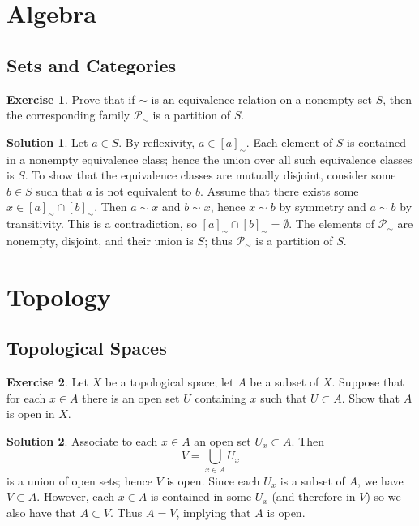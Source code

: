\documentclass{article}
\theoremstyle{definition}
\newtheorem{exercise}{Exercise}
\newtheorem*{solution}{Solution}
\begin{document}
\section*{Algebra}
\subsection*{Sets and Categories}

\begin{exercise}
    Prove that if \(\sim\) is an equivalence relation on a nonempty set \(S\), then the corresponding family \(\mathscr{P}_\sim\) is a partition of \(S\).
\end{exercise}
\begin{solution}
    Let \(a\in S\). By reflexivity, \(a\in[a]_\sim\). Each element of \(S\) is contained in a nonempty equivalence class; hence the union over all such equivalence classes is \(S\). To show that the equivalence classes are mutually disjoint, consider some \(b\in S\) such that \(a\) is not equivalent to \(b\). Assume that there exists some \(x\in [a]_\sim\cap[b]_\sim\). Then \(a\sim x\) and \(b\sim x\), hence \(x\sim b\) by symmetry and \(a\sim b\) by transitivity. This is a contradiction, so \([a]_\sim\cap[b]_\sim=\emptyset\). The elements of \(\mathscr{P}_\sim\) are nonempty, disjoint, and their union is \(S\); thus \(\mathscr{P}_\sim\) is a partition of \(S\).
\end{solution}

\section*{Topology}
\subsection*{Topological Spaces}

\begin{exercise}
    Let \(X\) be a topological space; let \(A\) be a subset of \(X\). Suppose that for each \(x\in A\) there is an open set \(U\) containing \(x\) such that \(U\subset A\). Show that \(A\) is open in \(X\).
\end{exercise}
\begin{solution}
    Associate to each \(x\in A\) an open set \(U_x\subset A\). Then
    \[V=\bigcup_{x\in A} U_x\]
    is a union of open sets; hence \(V\) is open. Since each \(U_x\) is a subset of \(A\), we have \(V\subset A\). However, each \(x\in A\) is contained in some \(U_x\) (and therefore in \(V\)) so we also have that \(A\subset V\). Thus \(A=V\), implying that \(A\) is open.
\end{solution}
\end{document}
